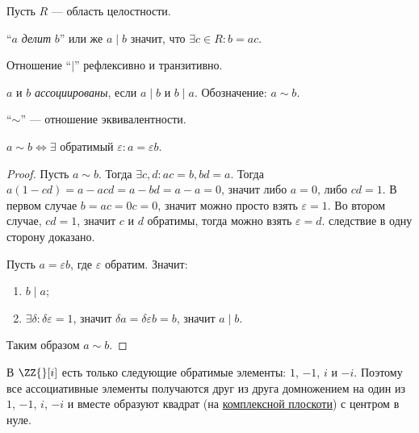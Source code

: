 \documentclass[12pt,a4paper]{article}
\begin{document}
    Пусть $R$ --- область целостности.

    \begin{definition}
        ``$a$ \emph{делит} $b$'' или же $a \mid b$ значит, что $\exists c \in R: b = ac$.
    \end{definition}

    \begin{statement}
        Отношение ``$\mid$'' рефлексивно и транзитивно.
    \end{statement}

    \begin{definition}
        $a$ и $b$ \emph{ассоциированы}, если $a \mid b$ и $b \mid a$. Обозначение: $a \sim b$.
    \end{definition}

    \begin{statement}
        ``$\sim$'' --- отношение эквивалентности.
    \end{statement}

    \begin{statement}
        $a \sim b \Leftrightarrow \exists \text{ обратимый } \varepsilon: a = \varepsilon b$.
    \end{statement}

    \begin{proof}
        Пусть $a \sim b$. Тогда $\exists c, d: ac = b, bd = a$. Тогда $a(1-cd) = a - acd = a - bd = a - a = 0$, значит либо $a = 0$, либо $cd = 1$. В первом случае $b = ac = 0c = 0$, значит можно просто взять $\varepsilon = 1$. Во втором случае, $cd = 1$, значит $c$ и $d$ обратимы, тогда можно взять $\varepsilon = d$. следствие в одну сторону доказано.

        Пусть $a = \varepsilon b$, где $\varepsilon$ обратим. Значит:
        \begin{enumerate}
            \item $b\mid a$;
            \item $\exists \delta: \delta\varepsilon = 1$, значит $\delta a = \delta \varepsilon b = b$, значит $a \mid b$.
        \end{enumerate}
        Таким образом $a \sim b$.
    \end{proof}

    \begin{example}
        В $\ZZ{}[i]$ есть только следующие обратимые элементы: $1$, $-1$, $i$ и $-i$. Поэтому все ассоциативные элементы получаются друг из друга домножением на один из $1$, $-1$, $i$, $-i$ и вместе образуют квадрат (на \href{https://ru.wikipedia.org/wiki/%D0%9A%D0%BE%D0%BC%D0%BF%D0%BB%D0%B5%D0%BA%D1%81%D0%BD%D0%B0%D1%8F_%D0%BF%D0%BB%D0%BE%D1%81%D0%BA%D0%BE%D1%81%D1%82%D1%8C}{комплексной плоскоти}) с центром в нуле.
    \end{example}
\end{document}

